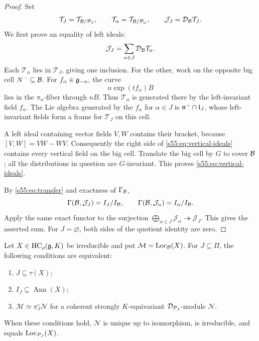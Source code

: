 \begin{proof}
Set
\[
 \mathcal T_J=\mathcal T_{\mathcal{B}/\mathcal{P}_J},\qquad
 \mathcal T_\alpha=\mathcal T_{\mathcal{B}/\mathcal{P}_\alpha},\qquad
 \mathcal J_J=\mathcal D_{\mathcal{B}}\mathcal T_J.
\]
We first prove an equality of left ideals:
\begin{equation}
\label{s55:eq:vertical-ideals}
 \mathcal J_J
   =\sum_{\alpha\in J}\mathcal D_{\mathcal{B}}\mathcal T_\alpha.
\end{equation}
Each $\mathcal T_\alpha$ lies in $\mathcal T_J$, giving one inclusion.
For the other, work on the opposite big cell $N^-\subseteq\mathcal{B}$.
For $f_\alpha\in\mathfrak{g}_{-\alpha}$, the curve
\[
  n\exp(t f_\alpha)B
\]
lies in the $\pi_\alpha$-fiber through $nB$. Thus $\mathcal T_\alpha$
is generated there by the left-invariant field $f_\alpha$. The Lie algebra
generated by the $f_\alpha$ for $\alpha\in J$ is
$\mathfrak n^-\cap\mathfrak{l}_J$, whose left-invariant fields form a frame for
$\mathcal T_J$ on this cell.

A left ideal containing vector fields $V,W$ contains their bracket,
because $[V,W]=VW-WV$. Consequently the right side of
\eqref{s55:eq:vertical-ideals} contains every vertical field on the big cell.
Translate the big cell by $G$ to cover $\mathcal{B}$; all the distributions in
question are $G$-invariant. This proves \eqref{s55:eq:vertical-ideals}.

By \eqref{s55:eq:transfer} and exactness of $\Gamma_{\mathcal{B}}$,
\[
 \Gamma(\mathcal{B},\mathcal J_J)=I_J/I_{\mathcal{B}},\qquad
 \Gamma(\mathcal{B},\mathcal J_\alpha)=I_\alpha/I_{\mathcal{B}}.
\]
Apply the same exact functor to the surjection
$\bigoplus_{\alpha\in J}\mathcal J_\alpha\twoheadrightarrow\mathcal J_J$.
This gives the asserted sum. For $J=\varnothing$, both sides of the
quotient identity are zero.
\end{proof}

\begin{thm}
\label{s55:thm:descent}
Let $X\in\operatorname{HC}_\rho(\mathfrak{g},K)$ be irreducible and put
$\mathcal M=\operatorname{Loc}_{\mathcal{B}}(X)$. For $J\subseteq\Pi$, the following
conditions are equivalent:
\begin{enumerate}
\renewcommand{\labelenumi}{\textup{(\roman{enumi})}}
 \item $J\subseteq\tau(X)$;
 \item $I_J\subseteq\operatorname{Ann}(X)$;
 \item $\mathcal M\simeq\pi_J^\circ\mathcal N$ for a coherent strongly
       $K$-equivariant $\mathcal D_{\mathcal{P}_J}$-module $\mathcal N$.
\end{enumerate}
When these conditions hold, $\mathcal N$ is unique up to isomorphism,
is irreducible, and equals $\operatorname{Loc}_{\mathcal{P}_J}(X)$.
\end{thm}


